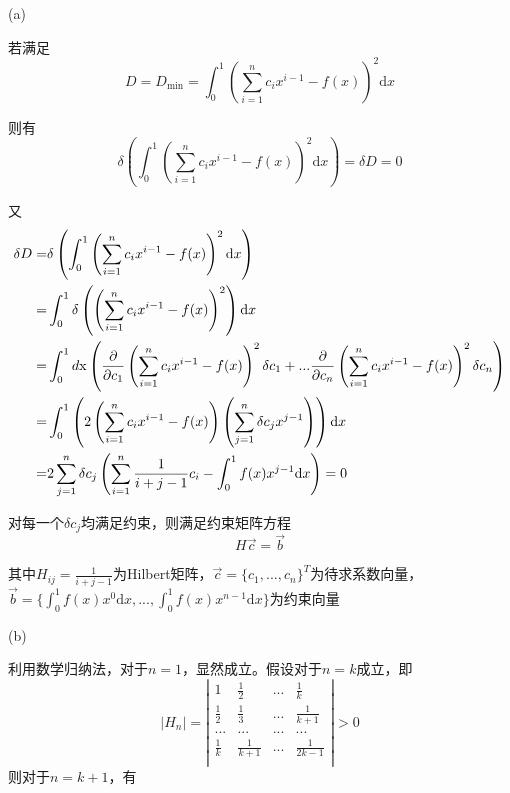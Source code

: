 \documentclass{article}
\begin{document}
(a)\par
若满足
$$D=D_{\min}=\int_0^1\left(\sum_{i=1}^nc_ix^{i-1}-f(x)\right)^2\mathrm{d}x$$
\par
则有
$$\delta \left(\int_0^1\left(\sum_{i=1}^nc_ix^{i-1}-f(x)\right)^2\mathrm{d}x\right)=\delta D=0$$
\par
又
\begin{equation}
    \begin{gathered}
     \begin{split}
        \delta D=&\delta \left(\int_0^1\left(\sum_{i=1}^nc_ix^{i-1}-f(x)\right)^2\mathrm{d}x\right)\\
        =&\int_0^1\delta\left(\left(\sum_{i=1}^nc_ix^{i-1}-f(x)\right)^2\right)\mathrm{d}x\\
        =&\int_0^1d\mathrm{x}\left(\frac{\partial}{\partial c_1}\left(\sum_{i=1}^nc_ix^{i-1}-f(x)\right)^2\delta c_1+...\frac{\partial}{\partial c_n}\left(\sum_{i=1}^nc_ix^{i-1}-f(x)\right)^2\delta c_n\right)\\
        =&\int_0^1\left(2\left(\sum_{i=1}^nc_ix^{i-1}-f(x)\right)\left(\sum_{j=1}^n\delta c_jx^{j-1}\right)\right)\mathrm{d}x\\
        =&2\sum_{j=1}^n\delta c_j\left(\sum_{i=1}^n\frac{1}{i+j-1}c_i-\int_0^1f(x)x^{j-1}\mathrm{d}x\right)=0
    \notag
    \end{split}
    \end{gathered}
\end{equation}
\par
对每一个$\delta c_j$均满足约束，则满足约束矩阵方程
$$
H\vec c=\vec b
$$
\par
其中$H_{ij}=\frac{1}{i+j-1}$为Hilbert矩阵，$\vec c=\{c_1,...,c_n\}^T$为待求系数向量，$\vec b=\{\int_0^1f(x)x^0\mathrm{d}x,...,\int_0^1f(x)x^{n-1}\mathrm{d}x\}$为约束向量
\par
(b)\par
利用数学归纳法，对于$n=1$，显然成立。假设对于$n=k$成立，即
$$
|H_n|=
\left|
\begin{matrix}
    1 & \frac{1}{2} & ... & \frac{1}{k}\\
    \frac{1}{2} & \frac{1}{3} & ... & \frac{1}{k+1}\\
    ... & ... & ... & ...\\
    \frac{1}{k} & \frac{1}{k+1} & ... & \frac{1}{2k-1}\\
\end{matrix}
\right|
>0
$$
则对于$n=k+1$，有
\end{document}
